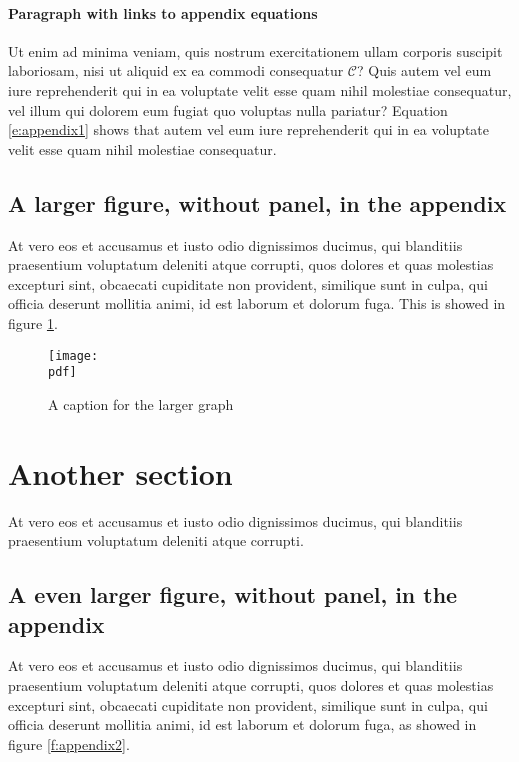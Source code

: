 \documentclass[letterpaper,12pt,leqno]{article}
\newcommand{\pdf}{figures.pdf}
\begin{document}
\paragraph{Paragraph with links to appendix equations} Ut enim ad minima veniam, quis nostrum exercitationem ullam corporis suscipit laboriosam, nisi ut aliquid ex ea commodi consequatur $\mathcal{C}$? Quis autem vel eum iure reprehenderit qui in ea voluptate velit esse quam nihil molestiae consequatur, vel illum qui dolorem eum fugiat quo voluptas nulla pariatur? Equation \eqref{e:appendix1} shows that autem vel eum iure reprehenderit qui in ea voluptate velit esse quam nihil molestiae consequatur.

\subsection{A larger figure, without panel, in the appendix} 

At vero eos et accusamus et iusto odio dignissimos ducimus, qui blanditiis praesentium voluptatum deleniti atque corrupti, quos dolores et quas molestias excepturi sint, obcaecati cupiditate non provident, similique sunt in culpa, qui officia deserunt mollitia animi, id est laborum et dolorum fuga. This is showed in figure \ref{f:appendix1}.

\begin{figure}[t]
\texttt{[image: \\pdf]}
\caption{A caption for the larger graph}
\label{f:appendix1}\end{figure}

\section{Another section}\label{a:appendix2}

At vero eos et accusamus et iusto odio dignissimos ducimus, qui blanditiis praesentium voluptatum deleniti atque corrupti.

\subsection{A even larger figure, without panel, in the appendix} 

At vero eos et accusamus et iusto odio dignissimos ducimus, qui blanditiis praesentium voluptatum deleniti atque corrupti, quos dolores et quas molestias excepturi sint, obcaecati cupiditate non provident, similique sunt in culpa, qui officia deserunt mollitia animi, id est laborum et dolorum fuga, as showed in figure \ref{f:appendix2}.
\end{document}

